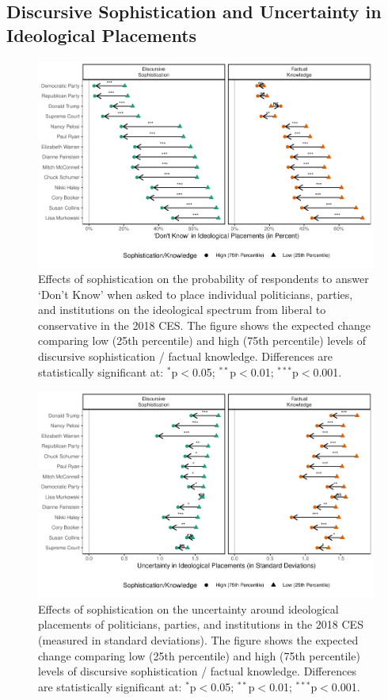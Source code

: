 \clearpage
\subsection{Discursive Sophistication and Uncertainty in Ideological Placements}\label{app:placement}

\begin{figure}[h]\centering
	\includegraphics{../fig/placements_dk.pdf}
	\caption{Effects of sophistication on the probability of respondents to answer `Don't Know' when asked to place individual politicians, parties, and institutions on the ideological spectrum from liberal to conservative in the 2018 CES. The figure shows the expected change comparing low (25th percentile) and high (75th percentile) levels of discursive sophistication / factual knowledge. Differences are statistically significant at: $^{*}$p$<$0.05; $^{**}$p$<$0.01; $^{***}$p$<$0.001.}\label{fig:placements_dk}
\end{figure}

\begin{figure}[h]\centering
	\includegraphics{../fig/placements.pdf}
	\caption{Effects of sophistication on the uncertainty around ideological placements of  politicians, parties, and institutions in the 2018 CES (measured in standard deviations). The figure shows the expected change comparing low (25th percentile) and high (75th percentile) levels of discursive sophistication / factual knowledge. Differences are statistically significant at: $^{*}$p$<$0.05; $^{**}$p$<$0.01; $^{***}$p$<$0.001.}\label{fig:placements}
\end{figure}

